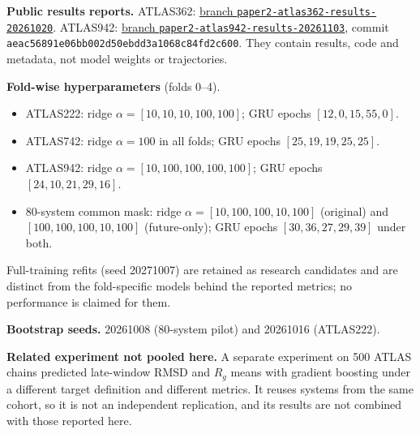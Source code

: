 \documentclass[11pt]{article}
\begin{document}
\textbf{Public results reports.} ATLAS362: \href{https://github.com/fhernandogallego/md-hpc-benchmarks-public/tree/paper2-atlas362-results-20261020/reports/paper2_atlas362_cv_20261020}{branch \texttt{paper2-atlas362-results-20261020}}. ATLAS942: \href{https://github.com/fhernandogallego/md-hpc-benchmarks-public/tree/paper2-atlas942-results-20261103/reports/paper2_atlas942_cv_20261103}{branch \texttt{paper2-atlas942-results-20261103}}, commit \texttt{aeac5689\allowbreak 1e06bb00\allowbreak 2d50ebdd\allowbreak 3a1068c8\allowbreak 4fd2c600}. They contain results, code and metadata, not model weights or trajectories.

\textbf{Fold-wise hyperparameters} (folds 0--4).
\begin{itemize}
\item ATLAS222: ridge $\alpha=[10,10,10,100,100]$; GRU epochs $[12,0,15,55,0]$.
\item ATLAS742: ridge $\alpha=100$ in all folds; GRU epochs $[25,19,19,25,25]$.
\item ATLAS942: ridge $\alpha=[10,100,100,100,100]$; GRU epochs $[24,10,21,29,16]$.
\item 80-system common mask: ridge $\alpha=[10,100,100,10,100]$ (original) and $[100,100,100,10,100]$ (future-only); GRU epochs $[30,36,27,29,39]$ under both.
\end{itemize}
Full-training refits (seed 20271007) are retained as research candidates and are distinct from the fold-specific models behind the reported metrics; no performance is claimed for them.

\textbf{Bootstrap seeds.} 20261008 (80-system pilot) and 20261016 (ATLAS222).

\textbf{Related experiment not pooled here.} A separate experiment on 500 ATLAS chains predicted late-window RMSD and $R_g$ means with gradient boosting under a different target definition and different metrics. It reuses systems from the same cohort, so it is not an independent replication, and its results are not combined with those reported here.
\end{document}
